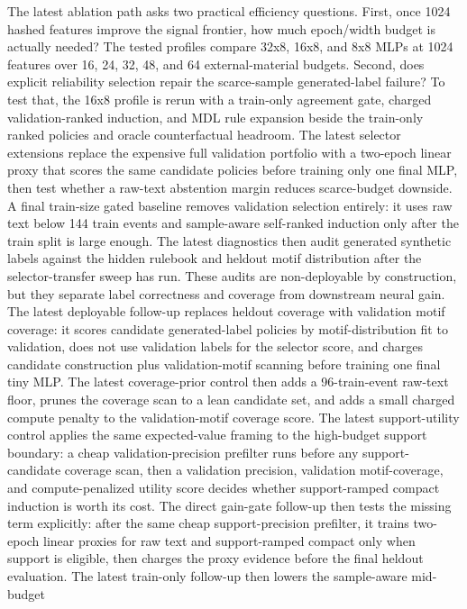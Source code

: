\documentclass[11pt]{article}
\begin{document}
The latest ablation path asks two practical efficiency questions. First, once
1024 hashed features improve the signal frontier, how much epoch/width budget
is actually needed? The tested profiles compare 32x8, 16x8, and 8x8 MLPs at
1024 features over 16, 24, 32, 48, and 64 external-material budgets. Second,
does explicit reliability selection repair the scarce-sample generated-label
failure? To test that, the 16x8 profile is rerun with a train-only agreement
gate, charged validation-ranked induction, and MDL rule expansion beside the
train-only ranked policies and oracle counterfactual headroom.
The latest selector extensions replace the expensive full validation portfolio
with a two-epoch linear proxy that scores the same candidate policies before
training only one final MLP, then test whether a raw-text abstention margin
reduces scarce-budget downside. A final train-size gated baseline removes
validation selection entirely: it uses raw text below 144 train events and
sample-aware self-ranked induction only after the train split is large enough.
The latest diagnostics then audit generated synthetic labels against the hidden
rulebook and heldout motif distribution after the selector-transfer sweep has
run. These audits are non-deployable by construction, but they separate label
correctness and coverage from downstream neural gain.
The latest deployable follow-up replaces heldout coverage with validation motif
coverage: it scores candidate generated-label policies by motif-distribution
fit to validation, does not use validation labels for the selector score, and
charges candidate construction plus validation-motif scanning before training
one final tiny MLP.
The latest coverage-prior control then adds a 96-train-event raw-text floor,
prunes the coverage scan to a lean candidate set, and adds a small charged
compute penalty to the validation-motif coverage score.
The latest support-utility control applies the same expected-value framing to
the high-budget support boundary: a cheap validation-precision prefilter runs
before any support-candidate coverage scan, then a validation precision,
validation motif-coverage, and compute-penalized utility score decides whether
support-ramped compact induction is worth its cost.
The direct gain-gate follow-up then tests the missing term explicitly: after
the same cheap support-precision prefilter, it trains two-epoch linear proxies
for raw text and support-ramped compact only when support is eligible, then
charges the proxy evidence before the final heldout evaluation.
The latest train-only follow-up then lowers the sample-aware mid-budget
\end{document}
